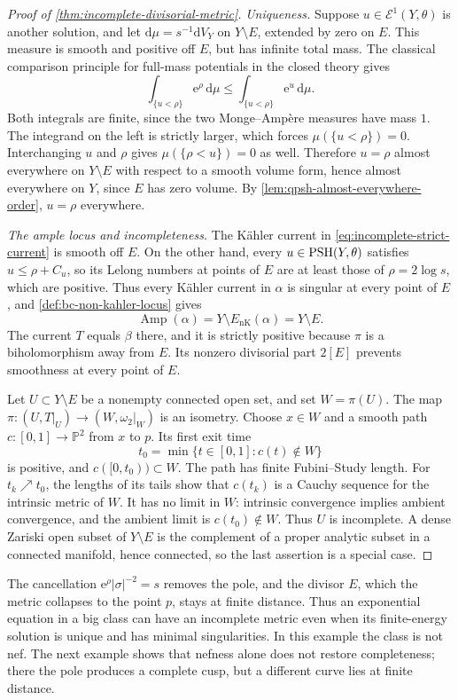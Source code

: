 \begin{proof}[Proof of \cref{thm:incomplete-divisorial-metric}]
\emph{Uniqueness.}
Suppose $u\in\mathcal E^1(Y,\theta)$ is another solution, and let $\mathrm{d}\mu=s^{-1}\mathrm{d}V_Y$ on $Y\setminus E$, extended by zero on $E$. This measure is smooth and positive off $E$, but has infinite total mass. The classical comparison principle for full-mass potentials in the closed theory gives
\[
 \int_{\{u<\rho\}}\mathrm{e}^{\rho}\,\mathrm{d}\mu
 \leq\int_{\{u<\rho\}}\mathrm{e}^{u}\,\mathrm{d}\mu.
\]
Both integrals are finite, since the two Monge--Amp\`ere measures have mass $1$. The integrand on the left is strictly larger, which forces $\mu(\{u<\rho\})=0$. Interchanging $u$ and $\rho$ gives $\mu(\{\rho<u\})=0$ as well. Therefore $u=\rho$ almost everywhere on $Y\setminus E$ with respect to a smooth volume form, hence almost everywhere on $Y$, since $E$ has zero volume. By \cref{lem:qpsh-almost-everywhere-order}, $u=\rho$ everywhere.

\emph{The ample locus and incompleteness.}
The K\"ahler current in \eqref{eq:incomplete-strict-current} is smooth off $E$. On the other hand, every $u\in\mathrm{PSH}(Y,\theta)$ satisfies $u\leq\rho+C_u$, so its Lelong numbers at points of $E$ are at least those of $\rho=2\log s$, which are positive. Thus every K\"ahler current in $\alpha$ is singular at every point of $E$, and \cref{def:bc-non-kahler-locus} gives
\[
 \operatorname{Amp}(\alpha)=Y\setminus E_{\mathrm{nK}}(\alpha)
 =Y\setminus E.
\]
The current $T$ equals $\beta$ there, and it is strictly positive because $\pi$ is a biholomorphism away from $E$. Its nonzero divisorial part $2[E]$ prevents smoothness at every point of $E$.

Let $U\subset Y\setminus E$ be a nonempty connected open set, and set $W=\pi(U)$. The map $\pi\colon(U,T|_U)\to(W,\omega_2|_W)$ is an isometry. Choose $x\in W$ and a smooth path $c\colon[0,1]\to\mathbb P^2$ from $x$ to $p$. Its first exit time
\[
 t_0=\min\{t\in[0,1]:c(t)\notin W\}
\]
is positive, and $c([0,t_0))\subset W$. The path has finite Fubini--Study length. For $t_k\nearrow t_0$, the lengths of its tails show that $c(t_k)$ is a Cauchy sequence for the intrinsic metric of $W$. It has no limit in $W$: intrinsic convergence implies ambient convergence, and the ambient limit is $c(t_0)\notin W$. Thus $U$ is incomplete. A dense Zariski open subset of $Y\setminus E$ is the complement of a proper analytic subset in a connected manifold, hence connected, so the last assertion is a special case.
\end{proof}

The cancellation $\mathrm{e}^{\rho}|\sigma|^{-2}=s$ removes the pole, and the divisor $E$, which the metric collapses to the point $p$, stays at finite distance. Thus an exponential equation in a big class can have an incomplete metric even when its finite-energy solution is unique and has minimal singularities. In this example the class is not nef. The next example shows that nefness alone does not restore completeness; there the pole produces a complete cusp, but a different curve lies at finite distance.




